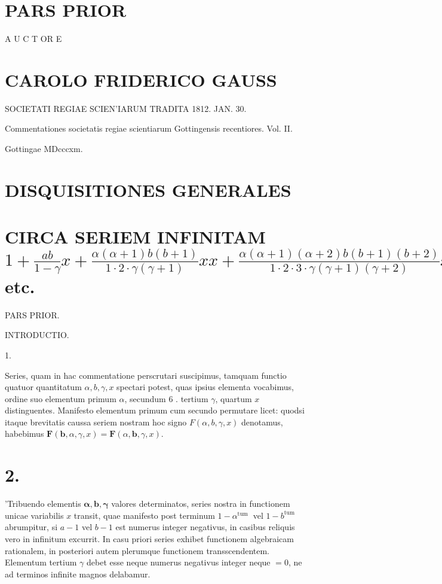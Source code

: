 \documentclass[10pt]{article}
\begin{document}
\section*{PARS PRIOR}
A U C T OR E

\section*{CAROLO FRIDERICO GAUSS}
SOCIETATI REGIAE SCIEN'IARUM TRADITA 1812. JAN. 30.

Commentationes societatis regiae scientiarum Gottingensis recentiores. Vol. II.

Gottingae MDcccxm.

\section*{DISQUISITIONES GENERALES}
\section*{CIRCA SERIEM INFINITAM \(1+\frac{a b}{1-\gamma} x+\frac{\alpha(\alpha+1) b(b+1)}{1 \cdot 2 \cdot \gamma(\gamma+1)} x x+\frac{\alpha(\alpha+1)(\alpha+2) b(b+1)(b+2)}{1 \cdot 2 \cdot 3 \cdot \gamma(\gamma+1)(\gamma+2)} x^{3}+\) etc.}
PARS PRIOR.

INTRODUCTIO.

1.

Series, quam in hac commentatione perscrutari suscipimus, tamquam functio quatuor quantitatum \(\alpha, b, \gamma, x\) spectari potest, quas ipsius elementa vocabimus, ordine suo elementum primum \(\alpha\), secundum 6 . tertium \(\gamma\), quartum \(x\) distinguentes. Manifesto elementum primum cum secundo permutare licet: quodsi itaque brevitatis caussa seriem nostram hoc signo \(F(\alpha, b, \gamma, x)\) denotamus, habebimus \(\boldsymbol{F}(\boldsymbol{b}, \alpha, \gamma, x)=\boldsymbol{F}(\alpha, \boldsymbol{b}, \gamma, x)\).

\section*{2.}
'Tribuendo elementis \(\boldsymbol{\alpha}, \boldsymbol{b}, \boldsymbol{\gamma}\) valores determinatos, series nostra in functionem unicae variabilis \(x\) transit, quae manifesto post terminum \(1-\alpha^{\text {tum }}\) vel \(1-b^{\text {tum }}\) abrumpitur, si \(a-1\) vel \(b-1\) est numerus integer negativus, in casibus reliquis vero in infinitum excurrit. In casu priori series exhibet functionem algebraicam rationalem, in posteriori autem plerumque functionem transscendentem. Elementum tertium \(\gamma\) debet esse neque numerus negativus integer neque \(=0\), ne ad terminos infinite magnos delabamur.
\end{document}
